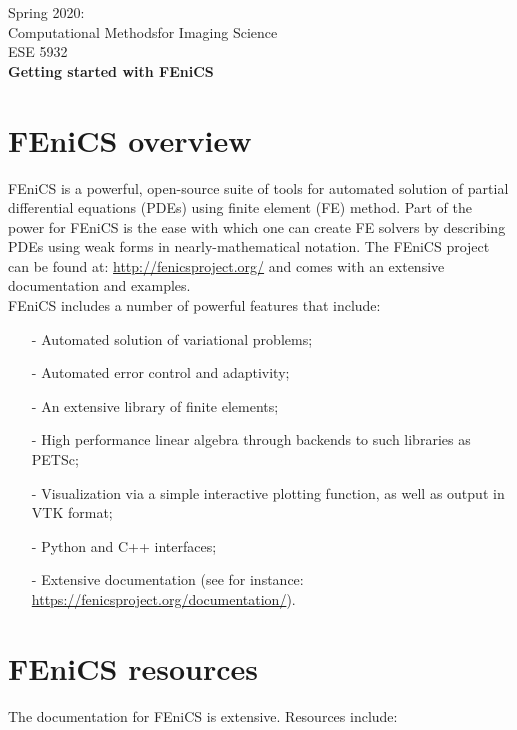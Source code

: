 \documentclass[11pt]{article}
\newcommand{\zapspace}{\topsep=0pt\partopsep=0pt\itemsep=0pt\parskip=0pt}
\begin{document}
\pagestyle{empty}

\begin{center}
\large \textsf{%
Spring 2020:\\
Computational Methodsfor Imaging Science\\
ESE 5932 \\[1mm]
\textbf{Getting started with FEniCS}}
\end{center}

\section{FEniCS overview}

FEniCS is a powerful, open-source suite of tools for automated
solution of partial differential equations (PDEs) using finite element (FE) method.
Part of the power for FEniCS
is the ease with which one can create FE solvers by describing PDEs
using weak forms in nearly-mathematical notation. The FEniCS project
can be found at:
\url{http://fenicsproject.org/} and comes with an extensive documentation and examples.\\

\noindent FEniCS includes a number of powerful features that include:
\vspace{-0.1in}
\begin{itemize}
\zapspace
\item[-] Automated solution of variational problems;
\item[-] Automated error control and adaptivity;
\item[-] An extensive library of finite elements;
\item[-] High performance linear algebra through backends to such
  libraries as PETSc;
\item[-] Visualization via a simple interactive plotting function, as
  well as output in VTK format;
\item[-] Python and C++ interfaces;
\item[-] Extensive documentation (see for instance:
  \url{https://fenicsproject.org/documentation/}).
\end{itemize}

\section{FEniCS resources}

The documentation for FEniCS is extensive. Resources include:
\end{document}
